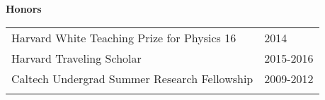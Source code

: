 \documentclass[letterpaper,11pt,oneside]{article}
\begin{document}
\vspace{-0.25cm}
\raggedright
 \textbf{\Large{Honors}} \\
\vspace{-0.5cm}
 \normalsize
\begin{flushleft}
\hspace{1cm}
\begin{tabular}{@{} l l }
 Harvard White Teaching Prize for Physics 16 & 2014\\
 Harvard Traveling Scholar & 2015-2016\\
 Caltech Undergrad Summer Research Fellowship & 2009-2012\\
    \hspace{0.8\linewidth} & \hspace{0.1\linewidth} \\
 \end{tabular}
\end{flushleft}

\end{document}
